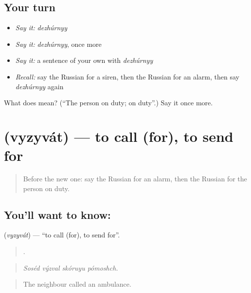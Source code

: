 \subsection*{Your turn}
\begin{itemize}
\raggedright
  \item \emph{Say it:} \emph{dezhúrnyy}
  \item \emph{Say it:} \emph{dezhúrnyy}, once more
  \item \emph{Say it:} a sentence of your own with \emph{dezhúrnyy}
  \item \emph{Recall:} say the Russian for a siren, then the Russian for an alarm, then say \emph{dezhúrnyy} again
\end{itemize}

\begin{tcolorbox}[breakable,colback=teal!4,colframe=teal!35!black,title={Before you move on}]
What does  mean? (\textquotedblleft{}The person on duty; on duty\textquotedblright{}.) Say it once more.
\end{tcolorbox}
\section[\texorpdfstring{\ru{вызывать} (vyzyvát)}{вызывать (vyzyvát)}]{ (vyzyvát) — to call (for), to send for}

\label{lesson:RU-C299-vyzyvat}



\begin{quote}
Before the new one: say the Russian for an alarm, then the Russian for the person on duty.
\end{quote}

\subsection*{You'll want to know: }
\textbf{} (\emph{vyzyvát}) — \textquotedblleft{}to call (for), to send for\textquotedblright{}.

\begin{quote}
   .
\end{quote}

\begin{quote}
\emph{Soséd výzval skóruyu pómoshch.}
\end{quote}

\begin{quote}
The neighbour called an ambulance.
\end{quote}

